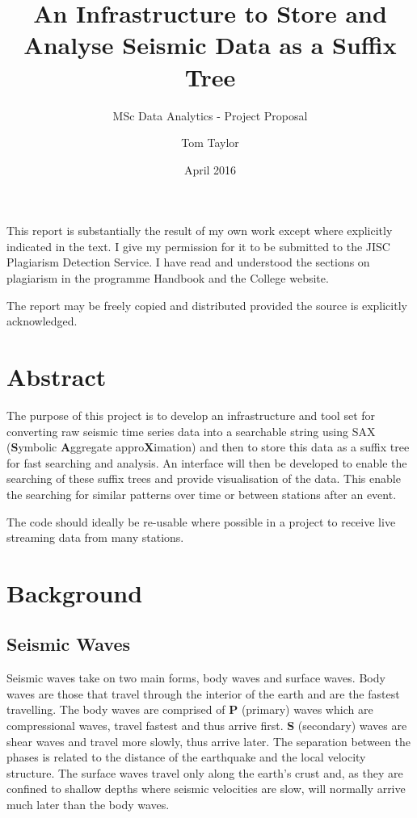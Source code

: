 \documentclass[11pt]{scrartcl}
\title{An Infrastructure to Store and Analyse Seismic Data as a Suffix Tree}
\subtitle{MSc Data Analytics - Project Proposal}
\date{April 2016}
\author{Tom Taylor}
\begin{document}
\maketitle
\begin{itshape}
	\noindent This report is substantially the result of my own work except where explicitly indicated in the text. I give my permission for it to be submitted to the JISC Plagiarism Detection Service. I have read and understood the sections on plagiarism in the programme Handbook and the College website.
	
	\noindent The report may be freely copied and distributed provided the source is explicitly acknowledged.
\end{itshape}

\tableofcontents

\newpage

\section{Abstract}
	The purpose of this project is to develop an infrastructure and tool set for converting raw seismic time series data into a searchable string using SAX (\textbf{S}ymbolic \textbf{A}ggregate appro\textbf{X}imation) and then to store this data as a suffix tree for fast searching and analysis.  An interface will then be developed to enable the searching of these suffix trees and provide visualisation of the data.  This enable the searching for similar patterns over time or between stations after an event.
	
	The code should ideally be re-usable where possible in a project to receive live streaming data from many stations.
	
\section{Background}
\subsection{Seismic Waves}
	Seismic waves take on two main forms, body waves and surface waves.  Body waves are those that travel through the interior of the earth and are the fastest travelling.  The body waves are comprised of \textbf{P} (primary) waves which are compressional waves, travel fastest and thus arrive first.  \textbf{S} (secondary) waves are shear waves and travel more slowly, thus arrive later.  The separation between the phases is related to the distance of the earthquake and the local velocity structure. The surface waves travel only along the earth’s crust and, as they are confined to shallow depths where seismic velocities are slow, will normally arrive much later than the body waves.
	
\end{document}
